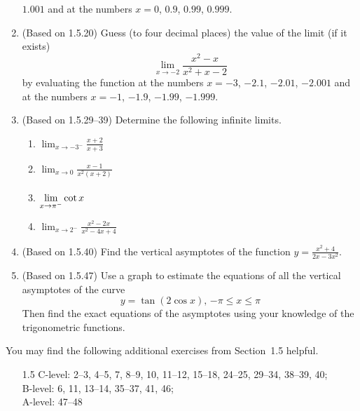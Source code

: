 \documentclass{article}
\newcommand{\ds}{\displaystyle}
\begin{document}
\begin{enumerate}
  $1.001$ and at the numbers $x=0$, $0.9$, $0.99$, $0.999$.
\item (Based on 1.5.20) %
  Guess (to four decimal places) the value of the limit (if it exists)
  \begin{equation*}
    \lim_{x\to -2} \frac{x^2-x}{x^2+x-2}
  \end{equation*}
  by evaluating the function at the numbers $x=-3$, $-2.1$, $-2.01$,
  $-2.001$ and at the numbers $x=-1$, $-1.9$, $-1.99$, $-1.999$.
\item (Based on 1.5.29--39) %
  Determine the following infinite limits.
  \begin{multicols}{4}
  \begin{enumerate}
  \item $\ds\lim_{x\to -3^-} \frac{x+2}{x+3}$
  \item $\ds\lim_{x\to 0}   \frac{x-1}{x^2(x+2)}$
  \item $\ds\lim_{x\to\pi^-} \cot x\vphantom{\frac{1}{1}}$
  \item $\ds\lim_{x\to 2^-}  \frac{x^2-2x}{x^2-4x+4}$
  \end{enumerate}
  \end{multicols}
\item (Based on 1.5.40) %
  Find the vertical asymptotes of the function
  $\ds y = \frac{x^2+4}{2x-3x^2}$.
\item (Based on 1.5.47) %
  Use a graph to estimate the equations of all the vertical asymptotes
  of the curve
  \begin{equation*}
    \mbox{$\ds y = \tan (2\cos x)$, $\ds -\pi\le x \le \pi$}
  \end{equation*}
  Then find the exact equations of the asymptotes using your knowledge
  of the trigonometric functions.
\end{enumerate}

\noindent
You may find the following additional exercises from Section~1.5 helpful.
\begin{itemize}
\item[1.5] C-level: 2--3, 4--5, 7, 8--9, 10, 11--12, 15--18, 24--25,
  29--34, 38--39, 40; \\
  B-level: 6, 11, 13--14, 35--37, 41, 46; \\
  A-level: 47--48
\end{itemize}
\end{document}
